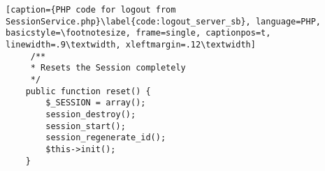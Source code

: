 \begin{lstlisting}[caption={PHP code for logout from SessionService.php}\label{code:logout_server_sb}, language=PHP, basicstyle=\footnotesize, frame=single, captionpos=t, linewidth=.9\textwidth, xleftmargin=.12\textwidth]
     /**
     * Resets the Session completely
     */
    public function reset() {
        $_SESSION = array();
        session_destroy();
        session_start();
        session_regenerate_id();
        $this->init();
    }
\end{lstlisting}